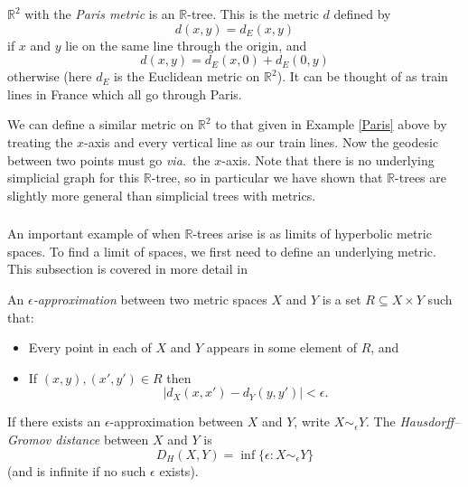 \begin{example}\label{Paris}
    $\mathbb{R}^2$ with the \textit{Paris metric} is an $\mathbb{R}$-tree. This is the metric $d$ defined by\[d(x,y)=d_E(x,y)\]if $x$ and $y$ lie on the same line through the origin, and\[d(x,y)=d_E(x,0)+d_E(0,y)\] otherwise (here $d_E$ is the Euclidean metric on $\mathbb{R}^2$). It can be thought of as train lines in France which all go through Paris.
\end{example}

\begin{example}\label{xtrains}
    We can define a similar metric on $\mathbb{R}^2$ to that given in Example \ref{Paris} above by treating the $x$-axis and every vertical line as our train lines. Now the geodesic between two points must go %
    \textit{via.}~the $x$-axis. Note that there is no underlying simplicial graph for this $\mathbb{R}$-tree, so in particular we have shown that $\mathbb{R}$-trees are slightly more general than simplicial trees with metrics.
\end{example}

\subsubsection{} An important example of when $\mathbb{R}$-trees arise is as limits of hyperbolic metric spaces. To find a limit of spaces, we first need to define an underlying metric. This subsection is covered in more detail in \cite{BridsonSwarup}

\begin{definition}
    An $\epsilon$\emph{-approximation} between two metric spaces $X$ and $Y$ is a set $R\subseteq X\times Y$ such that:
    \begin{itemize}
        \item Every point in each of $X$ and $Y$ appears in some element of $R$, and
        \item If $(x,y),(x',y')\in R$ then \[\lvert d_X(x,x')-d_Y(y,y')\rvert<\epsilon.\]
    \end{itemize}
    If there exists an $\epsilon$-approximation between $X$ and $Y$, write $X\sim_\epsilon Y$. The \emph{Hausdorff--Gromov distance} between $X$ and $Y$ is \[D_H(X,Y)=\inf\{\epsilon:X\sim_\epsilon Y\}\] (and is infinite if no such $\epsilon$ exists).
\end{definition}

